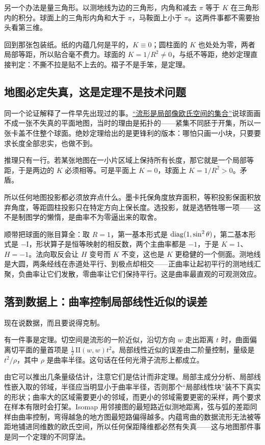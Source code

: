 另一个办法是量三角形。以测地线为边的三角形，内角和减去 \(\pi\) 等于 \(K\) 在三角形内的积分。球面上的三角形内角和大于 \(\pi\)，马鞍面上小于 \(\pi\)。这两件事都不需要抬头看第三维。

回到那张包装纸。纸的内蕴几何是平的，\(K\equiv0\)；圆柱面的 \(K\) 也处处为零，两者局部等距，所以贴合毫不费力。球面的 \(K=1/R^{2}\neq0\)，与纸不等距，绝妙定理直接判定：不撕不拉是贴不上去的。褶子不是手笨，是定理。

\subsection{地图必定失真，这是定理不是技术问题}

同一个论证解释了一件早先出现过的事。\hyperref[sec:12-Real-Analysis-Support/08-Manifold-Basics/01]{``流形是局部像欧氏空间的集合''}说球面画不成一张不失真的平面地图，当时的理由是拓扑的——紧集不同胚于开集，所以一张卡盖不住整个球面。绝妙定理给出的是更锋利的版本：哪怕只画一小块，只要要求长度全部忠实，也做不到。

推理只有一行。若某张地图在一小片区域上保持所有长度，那它就是一个局部等距，于是两边的 \(K\) 必须相等。可是平面上 \(K=0\)，球面上 \(K=1/R^{2}>0\)。矛盾。

所以任何地图投影都必须放弃点什么。墨卡托保角度放弃面积，等积投影保面积放弃角度，等距圆柱投影只在特定方向上保长度。选投影，就是选牺牲哪一项——这不是制图学的懒惰，是曲率不为零逼出来的取舍。

顺带把球面的账目算全：取 \(R=1\)，第一基本形式是 \(\operatorname{diag}(1,\sin^{2}\theta)\)，第二基本形式是 \(-\mathrm{I}\)，形状算子是恒等映射的相反数，两个主曲率都是 \(-1\)，于是 \(K=1\)、\(H=-1\)。法向取反会让 \(H\) 变号而 \(K\) 不变，这也是 \(K\) 更稳健的一个侧面。测地线是大圆，两条经线在赤道处平行、到极点却相交——正曲率让起初平行的测地线汇聚，负曲率让它们发散，零曲率让它们保持平行。这是曲率最直观的可观测效应。

\subsection{落到数据上：曲率控制局部线性近似的误差}

现在说数据，而且要说得克制。

有一件事是定理。切空间是流形的一阶近似，沿切方向 \(w\) 走出距离 \(t\) 时，曲面偏离切平面的量首项是 \(\tfrac12\,\mathrm{II}(w,w)t^{2}\)。局部线性近似的误差由二阶量控制，量级是 \(t^{2}/\rho\)，其中 \(\rho\) 是曲率半径。这句话在任何光滑子流形上都成立。

由它可以推出几条量级估计，注意它们是估计而非定理。局部主成分分析、局部线性嵌入取的邻域，半径应当明显小于曲率半径，否则那个``局部线性块''装不下真实的形状；曲率大的区域需要更小的邻域，而更小的邻域需要更密的采样，两个要求在样本有限时会打架。Isomap 用邻接图的最短路近似测地距离，弦与弧的差距同样由曲率控制，弯得越急的地方图最短路偏得越多。内蕴弯曲的数据流形无法被等距地铺进同维数的欧氏空间，所以任何保距降维都必然有失真——这与地图那件事是同一个定理的不同穿法。

